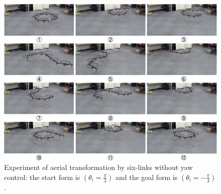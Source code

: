 \begin{figure}[th]
  \begin{center}
    \includegraphics[width=1.0\columnwidth]{figs/hydrus_transformation.pdf}
  \end{center}
  \caption{Experiment of aerial transformation by six-links without yaw control: the start form is $(\theta_i=\frac{\pi}{3})$ and the goal form is $(\theta_i=-\frac{\pi}{3})$.\label{figure:hydrus_transformation}}
\end{figure}

